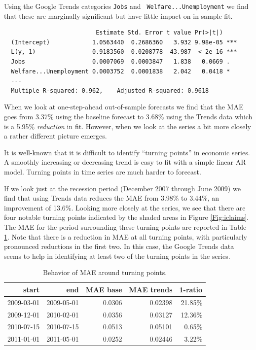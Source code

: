 \documentclass[12pt, oneside]{article}
\begin{document}
Using the Google Trends categories {\tt Jobs} and {\tt
  Welfare...Unemployment} we find that these are marginally
significant but have little impact on in-sample fit.

\small
\begin{verbatim}
                          Estimate Std. Error t value Pr(>|t|)    
  (Intercept)            1.0563440  0.2686360   3.932 9.98e-05 ***
  L(y, 1)                0.9183560  0.0208778  43.987  < 2e-16 ***
  Jobs                   0.0007069  0.0003847   1.838   0.0669 .  
  Welfare...Unemployment 0.0003752  0.0001838   2.042   0.0418 *  
  ---
  Multiple R-squared: 0.962,	Adjusted R-squared: 0.9618 
\end{verbatim}
\normalsize

When we look at one-step-ahead out-of-sample forecasts we find that
the MAE goes from 3.37\% using the baseline forecast to 3.68\% using
the Trends data which is a 5.95\% {\it reduction\/} in fit.  However,
when we look at the series a bit more closely a rather different
picture emerges.

It is well-known that it is difficult to identify ``turning points''
in economic series.  A smoothly increasing or decreasing trend is easy
to fit with a simple linear AR model.  Turning points in time series
are much harder to forecast.

If we look just at the recession period (December 2007 through June
2009) we find that using Trends data reduces the MAE from 3.98\% to
3.44\%, an improvement of 13.6\%.  Looking more closely at the series,
we see that there are four notable turning points indicated by the
shaded areas in Figure \ref{Fig:iclaims}.  The MAE for the period
surrounding these turning points are reported in Table
\ref{Tab:iclaims}. Note that there is a reduction in MAE at all
turning points, with particularly pronounced reductions in the first
two.  In this case, the Google Trends data seems to help in identifying at
least two of the turning points in the series.


\bigskip
\begin{table}
\begin{center}
\begin{tabular}{ r r r r r }
start & end & MAE base & MAE trends & 1-ratio \\
\hline
2009-03-01&2009-05-01&0.0306&0.02398&21.85\% \\
2009-12-01&2010-02-01&0.0356&0.03127&12.36\% \\
2010-07-15&2010-07-15&0.0513&0.05101& 0.65\% \\
2011-01-01&2011-05-01&0.0252&0.02446& 3.22\% \\
\hline
\end{tabular}
\end{center}
\caption{Behavior of MAE around turning points.\label{Tab:iclaims}}
\end{table}
\end{document}
